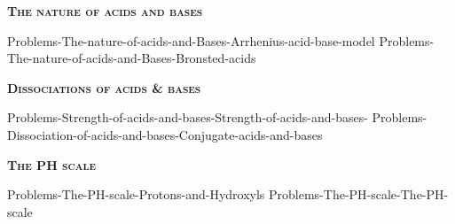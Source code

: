 \documentclass[main.tex]{subfiles}
\begin{document}
\newcommand\chapterlabel{Ch-acidbase}
\newpage
{}
\fancyhfoffset[E,O]{0pt}
\setlength{\columnsep}{30pt}
\begin{conclusion}
\iftoggle{chem121}{}{\setcounter{chapter}{5}}
\iftoggle{chem121}{\setcounter{chapter}{10}}{}
\end{conclusion}
\begin{multicols*}{2}\setcounter{numA}{1}  %



{\raggedright\textsc{\textbf{The nature of acids and bases}}\par}
 {Problems-The-nature-of-acids-and-Bases-Arrhenius-acid-base-model}
 {Problems-The-nature-of-acids-and-Bases-Bronsted-acids}
 
 \iftoggle{chem121}{}{
 {Problems-The-nature-of-acids-and-Bases-Lewis-acid-base-model}
}
{\raggedright\textsc{\textbf{Dissociations of acids \& bases}}\par}
 {Problems-Strength-of-acids-and-bases-Strength-of-acids-and-bases-}
 {Problems-Dissociation-of-acids-and-bases-Conjugate-acids-and-bases}
 
{\raggedright\textsc{\textbf{The PH scale}}\par}
 {Problems-The-PH-scale-Protons-and-Hydroxyls}
 {Problems-The-PH-scale-The-PH-scale}
 
 \iftoggle{chem121}{}{
  {\raggedright\textsc{\textbf{PH of strong acid-base solutions}}\par}
 {Problems-The-PH-scale-PH-of-strong-electrolyte-solutions} 

 
 {\raggedright\textsc{\textbf{PH of weak acid-base solutions}}\par}
 {Problems-The-PH-scale-PH-of-solutions-of-weak-acids-and-bases} 
 {Problems-The-PH-scale-PH-of-solutions-of-weak-acids-and-bases-Solutions-of-acids-and-bases} 
}	



\end{multicols*}
\end{document}
